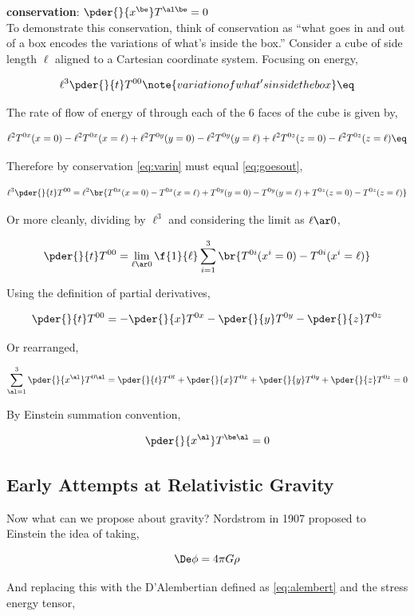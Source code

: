 \documentclass{article}
\begin{document}
\textbf{conservation}: $\pder{}{x^\be} T^{\al\be} = 0$ \\

To demonstrate this conservation, think of conservation as ``what goes in and out of a box encodes the variations of what's inside the box.'' Consider a cube of side length $\ell$ aligned to a Cartesian coordinate system. Focusing on energy,

\[ \ell^3 \pder{}{t} T^{00} \note{variation of what's inside the box} \eq \label{eq:varin} \]

The rate of flow of energy of through each of the 6 faces of the cube is given by,

\[ \ell^2 T^{0x}(x=0) - \ell^2T^{0x}(x=\ell) + \ell^2 T^{0y}(y=0) - \ell^2T^{0y}(y=\ell) + \ell^2 T^{0z}(z=0) - \ell^2T^{0z}(z=\ell) \eq \label{eq:goesout} \]

Therefore by conservation \eqref{eq:varin} must equal \eqref{eq:goesout},

\[ \ell^3 \pder{}{t} T^{00} = \ell^2 \br{T^{0x}(x=0) - T^{0x}(x=\ell) +  T^{0y}(y=0) - T^{0y}(y=\ell) +  T^{0z}(z=0) - T^{0z}(z=\ell)} \]

Or more cleanly, dividing by $\ell^3$ and considering the limit as $\ell \ar 0$,

\[ \pder{}{t} T^{00} = \lim_{\ell \ar 0} \f{1}{\ell} \sum_{i=1}^{3} \br{T^{0i} (x^i = 0) - T^{0i} (x^i = \ell)} \]

Using the definition of partial derivatives,

\[ \pder{}{t} T^{00} = -\pder{}{x}T^{0x}-\pder{}{y}T^{0y}-\pder{}{z}T^{0z} \]

Or rearranged,

\[ \sum_{\al=1}^{3} \pder{}{x^\al}T^{0\al} = \pder{}{t} T^{0t} + \pder{}{x}T^{0x} + \pder{}{y}T^{0y} + \pder{}{z}T^{0z} = 0 \]

By Einstein summation convention,

\[ \pder{}{x^\al}T^{\be\al} = 0 \]

\subsection{Early Attempts at Relativistic Gravity}

Now what can we propose about gravity? Nordstrom in 1907 proposed to Einstein the idea of taking,

\[ \De \phi = 4 \pi G \rho \]

And replacing this with the D'Alembertian defined as \eqref{eq:alembert} and the stress energy tensor,
\end{document}
